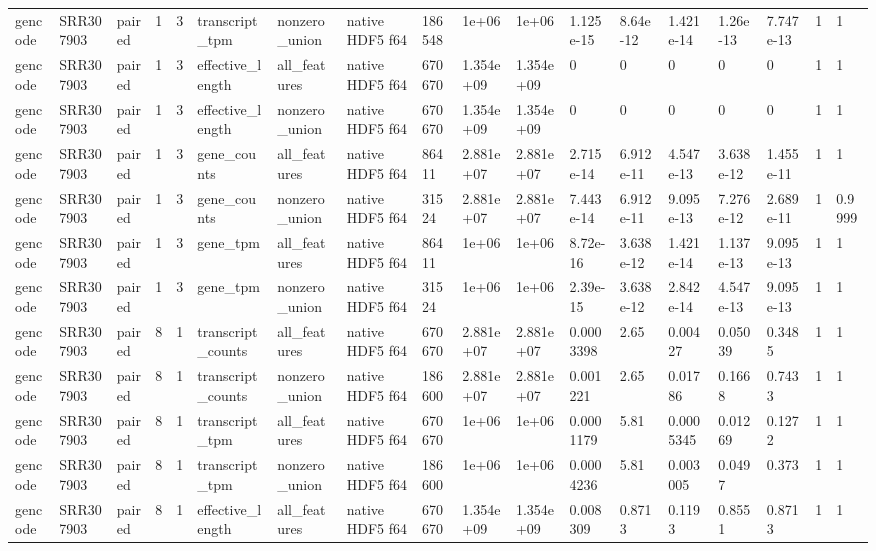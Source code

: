\begin{tabular}{llllllllllllllllll}
gencode & SRR307903 & paired & 1 & 3 & transcript\_tpm & nonzero\_union & native HDF5 f64 & 186548 & 1e+06 & 1e+06 & 1.125e-15 & 8.64e-12 & 1.421e-14 & 1.26e-13 & 7.747e-13 & 1 & 1 \\
gencode & SRR307903 & paired & 1 & 3 & effective\_length & all\_features & native HDF5 f64 & 670670 & 1.354e+09 & 1.354e+09 & 0 & 0 & 0 & 0 & 0 & 1 & 1 \\
gencode & SRR307903 & paired & 1 & 3 & effective\_length & nonzero\_union & native HDF5 f64 & 670670 & 1.354e+09 & 1.354e+09 & 0 & 0 & 0 & 0 & 0 & 1 & 1 \\
gencode & SRR307903 & paired & 1 & 3 & gene\_counts & all\_features & native HDF5 f64 & 86411 & 2.881e+07 & 2.881e+07 & 2.715e-14 & 6.912e-11 & 4.547e-13 & 3.638e-12 & 1.455e-11 & 1 & 1 \\
gencode & SRR307903 & paired & 1 & 3 & gene\_counts & nonzero\_union & native HDF5 f64 & 31524 & 2.881e+07 & 2.881e+07 & 7.443e-14 & 6.912e-11 & 9.095e-13 & 7.276e-12 & 2.689e-11 & 1 & 0.9999 \\
gencode & SRR307903 & paired & 1 & 3 & gene\_tpm & all\_features & native HDF5 f64 & 86411 & 1e+06 & 1e+06 & 8.72e-16 & 3.638e-12 & 1.421e-14 & 1.137e-13 & 9.095e-13 & 1 & 1 \\
gencode & SRR307903 & paired & 1 & 3 & gene\_tpm & nonzero\_union & native HDF5 f64 & 31524 & 1e+06 & 1e+06 & 2.39e-15 & 3.638e-12 & 2.842e-14 & 4.547e-13 & 9.095e-13 & 1 & 1 \\
gencode & SRR307903 & paired & 8 & 1 & transcript\_counts & all\_features & native HDF5 f64 & 670670 & 2.881e+07 & 2.881e+07 & 0.0003398 & 2.65 & 0.00427 & 0.05039 & 0.3485 & 1 & 1 \\
gencode & SRR307903 & paired & 8 & 1 & transcript\_counts & nonzero\_union & native HDF5 f64 & 186600 & 2.881e+07 & 2.881e+07 & 0.001221 & 2.65 & 0.01786 & 0.1668 & 0.7433 & 1 & 1 \\
gencode & SRR307903 & paired & 8 & 1 & transcript\_tpm & all\_features & native HDF5 f64 & 670670 & 1e+06 & 1e+06 & 0.0001179 & 5.81 & 0.0005345 & 0.01269 & 0.1272 & 1 & 1 \\
gencode & SRR307903 & paired & 8 & 1 & transcript\_tpm & nonzero\_union & native HDF5 f64 & 186600 & 1e+06 & 1e+06 & 0.0004236 & 5.81 & 0.003005 & 0.0497 & 0.373 & 1 & 1 \\
gencode & SRR307903 & paired & 8 & 1 & effective\_length & all\_features & native HDF5 f64 & 670670 & 1.354e+09 & 1.354e+09 & 0.008309 & 0.8713 & 0.1193 & 0.8551 & 0.8713 & 1 & 1 \\

\end{tabular}
